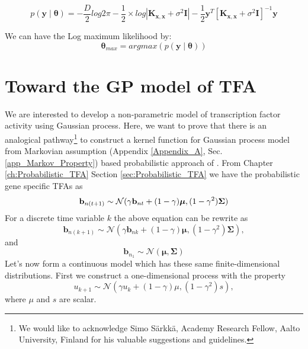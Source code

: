 \begin{equation} \label{eq:Likelihood}
 p \left(\mathbf{y}\middle|\boldsymbol{\theta}\right) =
    - \frac{D}{2}log2\pi - \frac{1}{2}\times log \left| \mathbf{K_{x,x}} + \sigma^2\mathbf{I}\right|
    - \frac{1}{2}\mathbf{y}^T \left[\mathbf{K_{x,x}} + \sigma^2\mathbf{I} \right]^{-1}\mathbf{y}
\end{equation}

We can have the Log maximum likelihood by:
\begin{equation} \label{eq:LML}
 \boldsymbol{\theta}_{max} = argmax \left( p\left(\mathbf{y}\middle|\boldsymbol{\theta}\right) \right)
\end{equation}


\section{Toward the GP model of TFA}\label{Sec:Toward_TFA}
 We are interested to develop a non-parametric model of transcription factor activity using Gaussian process. Here, we want to prove that there is an analogical pathway\footnote{We would like to acknowledge Simo S\"arkk\"a, Academy Research Fellow, Aalto University, Finland for his valuable suggestions and guidelines.} to construct a kernel function for Gaussian process model from Markovian assumption (Appendix \ref{Appendix_A}, Sec. \ref{app_Markov_Property}) based probabilistic approach of \cite{Sanguinetti:2006}. From Chapter \ref{ch:Probabilistic_TFA} Section \ref{sec:Probabilistic_TFA} we have the probabilistic gene specific TFAs as
\begin{equation} \label{eq:tfa_SanG_updateCh4}
  \bold{b}_{n(t+1)} \sim \mathcal{N} (\gamma \bold{b}_{nt} + (1-\gamma)\boldsymbol{\mu},(1-\gamma^2)\bold{\Sigma})
\end{equation}
For a discrete time variable $k$ the above equation can be rewrite as
\begin{equation}
\textbf{b}_{n(k+1)} \sim \mathcal{N}\left(\gamma \textbf{b}_{nk} + (1 - \gamma) \boldsymbol{\mu}, (1 - \gamma^2) \boldsymbol{\Sigma}\right),
\end{equation}
and
\begin{equation}
\textbf{b}_{n_1} \sim \mathcal{N}\left(\boldsymbol{\mu}, \boldsymbol{\Sigma}\right)
\end{equation}
Let's now form a continuous model which has these same finite-dimensional distributions. First we construct a one-dimensional process with the property
\begin{equation}
u_{k+1} \sim \mathcal{N}\left(\gamma u_k + \left(1 - \gamma\right) \mu, (1 - \gamma^2)s \right),
\end{equation}
where $\mu$ and $s$ are scalar.

